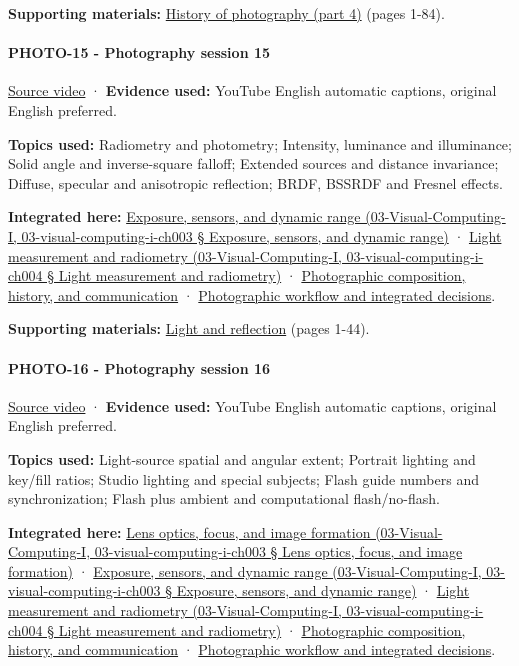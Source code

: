 \textbf{Supporting materials:} \href{https://drive.google.com/open?id=0B6w2XfPHEcZYTjRoLWhnSUFEYTQ}{History of photography (part 4)} (pages 1-84).

\paragraph{PHOTO-15 - Photography session 15}\label{photo-15---photography-session-15}

\href{https://www.youtube.com/watch?v=kO68jM_1eho}{Source video} · \textbf{Evidence used:} YouTube English automatic captions, original English preferred.

\textbf{Topics used:} Radiometry and photometry; Intensity, luminance and illuminance; Solid angle and inverse-square falloff; Extended sources and distance invariance; Diffuse, specular and anisotropic reflection; BRDF, BSSRDF and Fresnel effects.

\textbf{Integrated here:} \href{}{Exposure, sensors, and dynamic range (03-Visual-Computing-I, 03-visual-computing-i-ch003 § Exposure, sensors, and dynamic range)} · \href{}{Light measurement and radiometry (03-Visual-Computing-I, 03-visual-computing-i-ch004 § Light measurement and radiometry)} · \hyperref[04-visual-computing-ii-ch034]{Photographic composition, history, and communication} · \hyperref[04-visual-computing-ii-ch034]{Photographic workflow and integrated decisions}.

\textbf{Supporting materials:} \href{https://drive.google.com/open?id=0B6w2XfPHEcZYNHdYdjhMakktS28}{Light and reflection} (pages 1-44).

\paragraph{PHOTO-16 - Photography session 16}\label{photo-16---photography-session-16}

\href{https://www.youtube.com/watch?v=gy-6WhxVIqc}{Source video} · \textbf{Evidence used:} YouTube English automatic captions, original English preferred.

\textbf{Topics used:} Light-source spatial and angular extent; Portrait lighting and key/fill ratios; Studio lighting and special subjects; Flash guide numbers and synchronization; Flash plus ambient and computational flash/no-flash.

\textbf{Integrated here:} \href{}{Lens optics, focus, and image formation (03-Visual-Computing-I, 03-visual-computing-i-ch003 § Lens optics, focus, and image formation)} · \href{}{Exposure, sensors, and dynamic range (03-Visual-Computing-I, 03-visual-computing-i-ch003 § Exposure, sensors, and dynamic range)} · \href{}{Light measurement and radiometry (03-Visual-Computing-I, 03-visual-computing-i-ch004 § Light measurement and radiometry)} · \hyperref[04-visual-computing-ii-ch034]{Photographic composition, history, and communication} · \hyperref[04-visual-computing-ii-ch034]{Photographic workflow and integrated decisions}.

